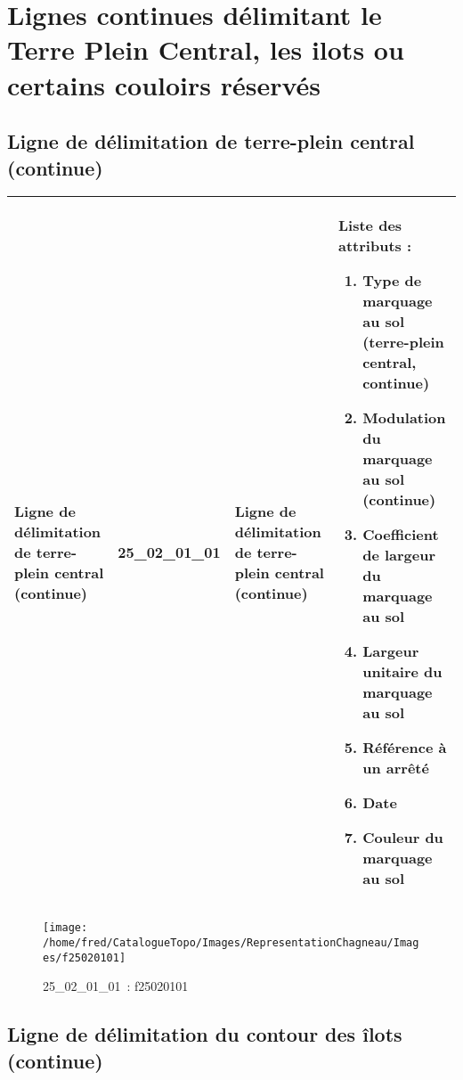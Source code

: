 \documentclass[12pt,titlepage]{book}
\begin{document}
\section{\large Lignes continues délimitant le Terre Plein Central, les ilots ou certains couloirs réservés}
\subsection{Ligne de délimitation de terre-plein central (continue)}
\noindent
\vspace{\baselineskip}

\renewcommand{\arraystretch}{1.2}
\begin{supertabular}{|p{10cm}|c|p{13cm}|p{12cm}|}
 Ligne de délimitation de terre-plein central (continue) & 25\_02\_01\_01 & Ligne de délimitation de terre-plein central (continue) & Liste des attributs :
\begin{enumerate}
  \item Type de marquage au sol (terre-plein central, continue)  \item Modulation du marquage au sol (continue)  \item Coefficient de largeur du marquage au sol  \item Largeur unitaire du marquage au sol  \item Référence à un arrêté  \item Date  \item Couleur du marquage au sol\end{enumerate}
\\
\hline
\end{supertabular}
\begin{figure}[h!]
  \hfill         %
  \begin{minipage}[t]{3cm}
    \begin{center}
      \texttt{[image: /home/fred/CatalogueTopo/Images/RepresentationChagneau/Images/f25020101]}
      \caption[~25\_02\_01\_01]{\small{25\_02\_01\_01~:} \tiny{f25020101}}\label{f25020101}
    \end{center}
  \end{minipage}
\end{figure}


\subsection{Ligne de délimitation du contour des îlots (continue)}
\noindent
\vspace{\baselineskip}
\end{document}
